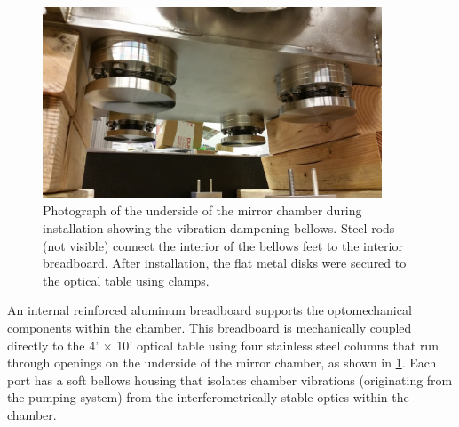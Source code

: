 \begin{figure}
	\centering
	\includegraphics[width=0.9\textwidth]{figures/chap2/mirror_chamber-bellows_feet_lowres.jpg}
	\caption{Photograph of the underside of the mirror chamber during installation showing the vibration-dampening bellows. Steel rods (not visible) connect the interior of the bellows feet to the interior breadboard. After installation, the flat metal disks were secured to the optical table using clamps.}
	\label{fig:mirror_chamber_bellows_feet}
\end{figure}

An internal reinforced aluminum breadboard supports the optomechanical components within the chamber. This breadboard is mechanically coupled directly to the 4' $\times$ 10' optical table using four stainless steel columns that run through openings on the underside of the mirror chamber, as shown in \cref{fig:mirror_chamber_bellows_feet}. Each port has a soft bellows housing that isolates chamber vibrations (originating from the pumping system) from the interferometrically stable optics within the chamber. 

